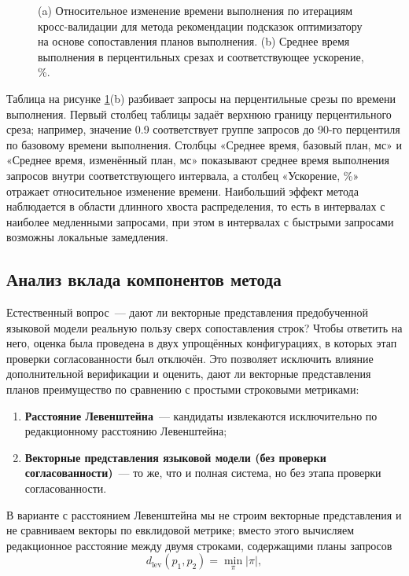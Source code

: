 \begin{figure}[htbp]
  \caption{(a) Относительное изменение времени выполнения по итерациям кросс-валидации для метода рекомендации подсказок оптимизатору на основе сопоставления планов выполнения.
  (b) Среднее время выполнения в перцентильных срезах и соответствующее ускорение, \%.}
  \label{fig:combined}
\end{figure}

Таблица на рисунке \ref{fig:combined}(b) разбивает запросы на перцентильные срезы по времени выполнения. Первый столбец таблицы задаёт верхнюю границу перцентильного среза; например, значение 0.9 соответствует группе запросов до 90-го перцентиля по базовому времени выполнения. Столбцы «Среднее время, базовый план, мс» и «Среднее время, изменённый план, мс» показывают среднее время выполнения запросов внутри соответствующего интервала, а столбец «Ускорение, \%» отражает относительное изменение времени. Наибольший эффект метода наблюдается в области длинного хвоста распределения, то есть в интервалах с наиболее медленными запросами, при этом в интервалах с быстрыми запросами возможны локальные замедления.

\subsection{Анализ вклада компонентов метода}
Естественный вопрос~--- дают ли векторные представления предобученной языковой модели реальную пользу сверх сопоставления строк? Чтобы ответить на него, оценка была проведена в двух упрощённых конфигурациях, в которых этап проверки согласованности был отключён. Это позволяет исключить влияние дополнительной верификации и оценить, дают ли векторные представления планов преимущество по сравнению с простыми строковыми метриками:

\begin{enumerate}
\item \textbf{Расстояние Левенштейна}~--- кандидаты извлекаются исключительно по редакционному расстоянию Левенштейна;
\item \textbf{Векторные представления языковой модели (без проверки согласованности)}~--- то же, что и полная система, но без этапа проверки согласованности.
\end{enumerate}

В варианте с расстоянием Левенштейна мы не строим векторные представления и не сравниваем векторы по евклидовой метрике; вместо этого вычисляем редакционное расстояние между двумя строками, содержащими планы запросов
\begin{equation}
d_{\text{lev}}(p_{1},p_{2})=\min_{\pi}\lvert\pi\rvert ,
\end{equation}

